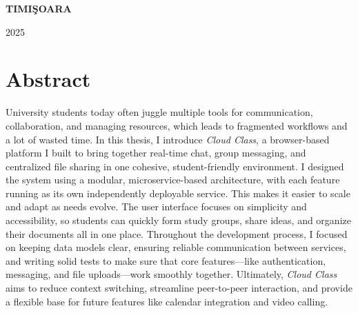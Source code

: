 \documentclass[12pt,a4paper]{book}
\theoremstyle{definition}
\theoremstyle{remark}
\begin{document}
\vfill
\begin{center}
{\bf TIMI\c SOARA

2025}
\end{center}


\newpage
\normalsize{}



\section*{Abstract} 
University students today often juggle multiple tools for communication, collaboration, and managing resources, which leads to fragmented workflows and a lot of wasted time. In this thesis, I introduce \emph{Cloud Class}, a browser-based platform I built to bring together real-time chat, group messaging, and centralized file sharing in one cohesive, student-friendly environment. I designed the system using a modular, microservice-based architecture, with each feature running as its own independently deployable service. This makes it easier to scale and adapt as needs evolve. The user interface focuses on simplicity and accessibility, so students can quickly form study groups, share ideas, and organize their documents all in one place. Throughout the development process, I focused on keeping data models clear, ensuring reliable communication between services, and writing solid tests to make sure that core features—like authentication, messaging, and file uploads—work smoothly together. Ultimately, \emph{Cloud Class} aims to reduce context switching, streamline peer-to-peer interaction, and provide a flexible base for future features like calendar integration and video calling.


\newpage
\normalsize{}

\tableofcontents









\end{document}
